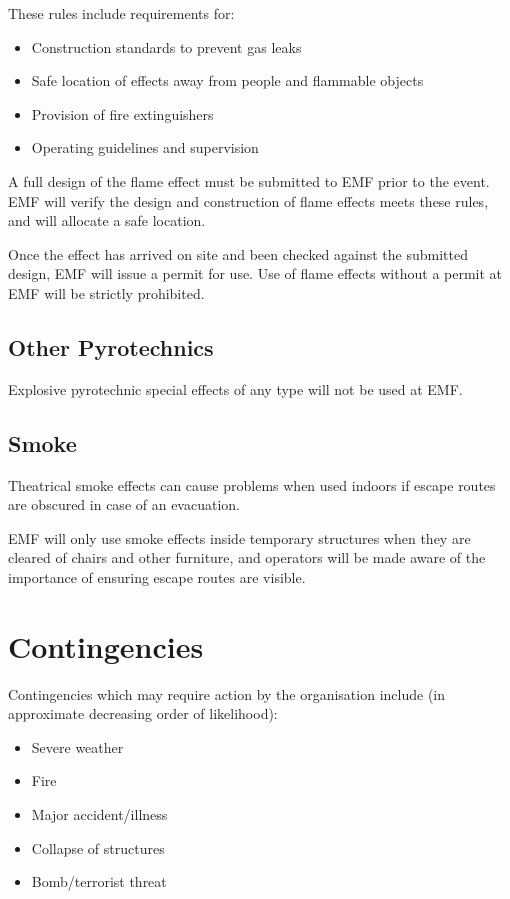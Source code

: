 These rules include requirements for:
\begin{itemize}
    \tightlist
    \item Construction standards to prevent gas leaks
    \item Safe location of effects away from people and flammable objects
    \item Provision of fire extinguishers
    \item Operating guidelines and supervision
\end{itemize}

A full design of the flame effect must be submitted to EMF prior to the
event. EMF will verify the design and construction of flame effects meets
these rules, and will allocate a safe location.

Once the effect has arrived on site and been checked against the submitted
design, EMF will issue a permit for use. Use of flame effects without a
permit at EMF will be strictly prohibited.

\subsection{Other Pyrotechnics}
Explosive pyrotechnic special effects of any type will not be used at EMF.

\subsection{Smoke}
Theatrical smoke effects can cause problems when used indoors if escape
routes are obscured in case of an evacuation.

EMF will only use smoke effects inside temporary structures when they are
cleared of chairs and other furniture, and operators will be made aware of
the importance of ensuring escape routes are visible.

\newpage

\section{Contingencies}\label{contingencies}
Contingencies which may require action by the organisation include (in
approximate decreasing order of likelihood):

\begin{itemize}
\tightlist
  \item Severe weather
  \item Fire
  \item Major accident/illness
  \item Collapse of structures
  \item Bomb/terrorist threat
\end{itemize}

